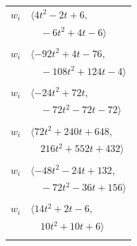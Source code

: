 \documentclass[11pt]{article}
\begin{document}
\begin{longtable}{@{}ll@{}}
$w_i$ & $\langle 4t^{2}-2t+6,$\\
 & $\quad -6t^{2}+4t-6\rangle$\\
\addlinespace[2pt]
\multicolumn{2}{@{}p{0.97\textwidth}@{}}{$i=5$, $D_i=4$, $\rho_{ij}$: $18{:}2, \allowbreak 27{:}2, \allowbreak 33{:}1, \allowbreak 39{:}2, \allowbreak 44{:}1, \allowbreak 45{:}2, \allowbreak 51{:}1, \allowbreak 52{:}2, \allowbreak 56{:}2, \allowbreak 60{:}1, \allowbreak 63{:}2$}\\
$w_i$ & $\langle -92t^{2}+4t-76,$\\
 & $\quad -108t^{2}+124t-4\rangle$\\
\addlinespace[2pt]
\multicolumn{2}{@{}p{0.97\textwidth}@{}}{$i=6$, $D_i=8$, $\rho_{ij}$: $2{:}2, \allowbreak 21{:}1, \allowbreak 28{:}2, \allowbreak 35{:}1, \allowbreak 38{:}1, \allowbreak 50{:}1, \allowbreak 54{:}2, \allowbreak 59{:}2, \allowbreak 60{:}2, \allowbreak 62{:}2$}\\
$w_i$ & $\langle -24t^{2}+72t,$\\
 & $\quad -72t^{2}-72t-72\rangle$\\
\addlinespace[2pt]
\multicolumn{2}{@{}p{0.97\textwidth}@{}}{$i=7$, $D_i=8$, $\rho_{ij}$: $24{:}1, \allowbreak 25{:}1, \allowbreak 26{:}2, \allowbreak 28{:}2, \allowbreak 31{:}2, \allowbreak 32{:}2, \allowbreak 33{:}1, \allowbreak 35{:}1, \allowbreak 36{:}1, \allowbreak 37{:}1, \allowbreak 38{:}2, \allowbreak 46{:}2, \allowbreak 54{:}2, \allowbreak 61{:}2$}\\
$w_i$ & $\langle 72t^{2}+240t+648,$\\
 & $\quad 216t^{2}+552t+432\rangle$\\
\addlinespace[2pt]
\multicolumn{2}{@{}p{0.97\textwidth}@{}}{$i=8$, $D_i=4$, $\rho_{ij}$: $22{:}2, \allowbreak 27{:}2, \allowbreak 31{:}1, \allowbreak 36{:}1, \allowbreak 44{:}1, \allowbreak 45{:}2, \allowbreak 49{:}1, \allowbreak 50{:}2, \allowbreak 53{:}1, \allowbreak 61{:}2, \allowbreak 63{:}1$}\\
$w_i$ & $\langle -48t^{2}-24t+132,$\\
 & $\quad -72t^{2}-36t+156\rangle$\\
\addlinespace[2pt]
\multicolumn{2}{@{}p{0.97\textwidth}@{}}{$i=9$, $D_i=2$, $\rho_{ij}$: $20{:}2, \allowbreak 24{:}1, \allowbreak 28{:}2, \allowbreak 32{:}2, \allowbreak 33{:}1, \allowbreak 36{:}1, \allowbreak 42{:}1, \allowbreak 55{:}2$}\\
$w_i$ & $\langle 14t^{2}+2t-6,$\\
 & $\quad 10t^{2}+10t+6\rangle$\\
\addlinespace[2pt]

\end{longtable}
\end{document}
